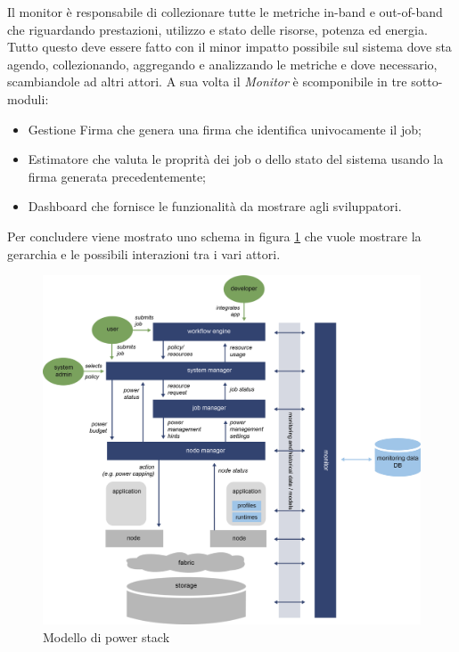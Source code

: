 Il monitor è responsabile di collezionare tutte le metriche in-band e out-of-band che riguardando prestazioni, utilizzo e stato delle risorse, potenza ed energia.
Tutto questo deve essere fatto con il minor impatto possibile sul sistema dove sta agendo, collezionando, aggregando e analizzando le metriche e dove necessario, scambiandole ad altri attori. A sua volta il \emph{Monitor} è scomponibile in tre sotto-moduli:
\begin{itemize}
    \item Gestione Firma che genera una firma che identifica univocamente il job; 
    \item Estimatore che valuta le proprità dei job o dello stato del sistema usando la firma generata precedentemente;
    \item Dashboard che fornisce le funzionalità da mostrare agli sviluppatori.
\end{itemize}


Per concludere viene mostrato uno schema in figura \ref{fig:powerstackscheme} che vuole mostrare la gerarchia e le possibili interazioni tra i vari attori.
\begin{figure}[H]
    \centering
    \includegraphics[width=\textwidth]{img/REGALE-Architecture-1536x1421.png}
    \caption{Modello di power stack} 
    \label{fig:powerstackscheme}
\end{figure}

